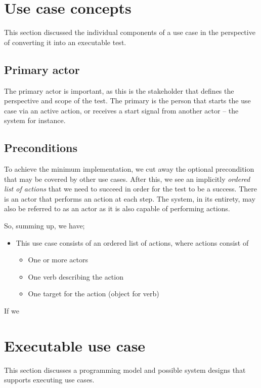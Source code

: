 \section{Use case concepts}
This section discussed the individual components of a use case in the perspective of converting it into an executable test.

\subsection{Primary actor}
The primary actor is important, as this is the stakeholder that defines the perspective and scope of the test. The primary is the person that starts the use case via an active action, or receives a start signal from another actor -- the system for instance.

\subsection{Preconditions}


To achieve the minimum implementation, we cut away the optional precondition that may be covered by other use cases. After this, we see an implicitly \emph{ordered list of actions} that we need to succeed in order for the test to be a success. There is an actor that performs an action at each step. The system, in its entirety, may also be referred to as an actor as it is also capable of performing actions.

So, summing up, we have;
\begin{itemize}
  \item This use case consists of an ordered list of actions, where actions consist of
  \begin{itemize}
	\item One or more actors
	\item One verb describing the action
	\item One target for the action (object for verb)
  \end{itemize}
\end{itemize}
If we 


\section{Executable use case}
This section discusses a programming model and possible system designs that supports executing use cases.

